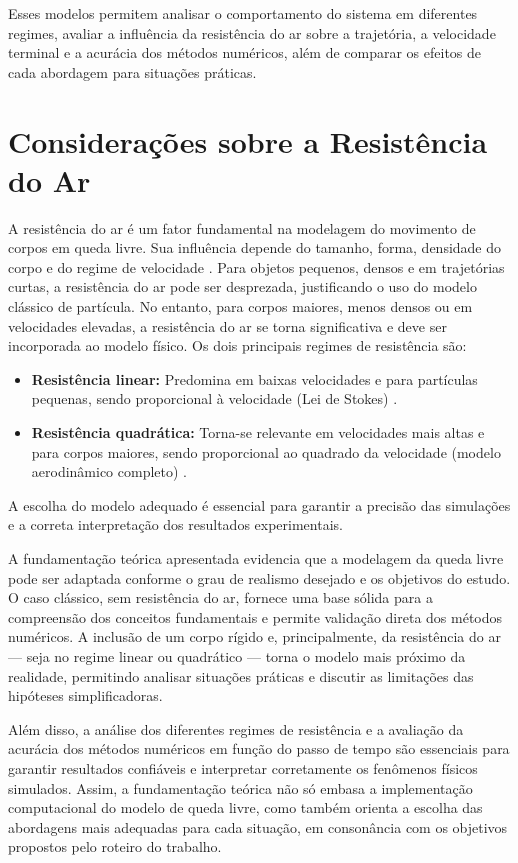 Esses modelos permitem analisar o comportamento do sistema em diferentes regimes, avaliar a influência da resistência do ar sobre a trajetória, a velocidade terminal e a acurácia dos métodos numéricos, além de comparar os efeitos de cada abordagem para situações práticas.

\section{Considerações sobre a Resistência do Ar}


A resistência do ar é um fator fundamental na modelagem do movimento de corpos em queda livre. Sua influência depende do tamanho, forma, densidade do corpo e do regime de velocidade \cite{halliday2011,batchelor2000}. Para objetos pequenos, densos e em trajetórias curtas, a resistência do ar pode ser desprezada, justificando o uso do modelo clássico de partícula. No entanto, para corpos maiores, menos densos ou em velocidades elevadas, a resistência do ar se torna significativa e deve ser incorporada ao modelo físico. Os dois principais regimes de resistência são:

\begin{itemize}
    \item \textbf{Resistência linear:} Predomina em baixas velocidades e para partículas pequenas, sendo proporcional à velocidade (Lei de Stokes) \cite{batchelor2000}.
    \item \textbf{Resistência quadrática:} Torna-se relevante em velocidades mais altas e para corpos maiores, sendo proporcional ao quadrado da velocidade (modelo aerodinâmico completo) \cite{batchelor2000,butcher2016}.
\end{itemize}

A escolha do modelo adequado é essencial para garantir a precisão das simulações e a correta interpretação dos resultados experimentais.

A fundamentação teórica apresentada evidencia que a modelagem da queda livre pode ser adaptada conforme o grau de realismo desejado e os objetivos do estudo. O caso clássico, sem resistência do ar, fornece uma base sólida para a compreensão dos conceitos fundamentais e permite validação direta dos métodos numéricos. A inclusão de um corpo rígido e, principalmente, da resistência do ar — seja no regime linear ou quadrático — torna o modelo mais próximo da realidade, permitindo analisar situações práticas e discutir as limitações das hipóteses simplificadoras.

Além disso, a análise dos diferentes regimes de resistência e a avaliação da acurácia dos métodos numéricos em função do passo de tempo são essenciais para garantir resultados confiáveis e interpretar corretamente os fenômenos físicos simulados. Assim, a fundamentação teórica não só embasa a implementação computacional do modelo de queda livre, como também orienta a escolha das abordagens mais adequadas para cada situação, em consonância com os objetivos propostos pelo roteiro do trabalho.


